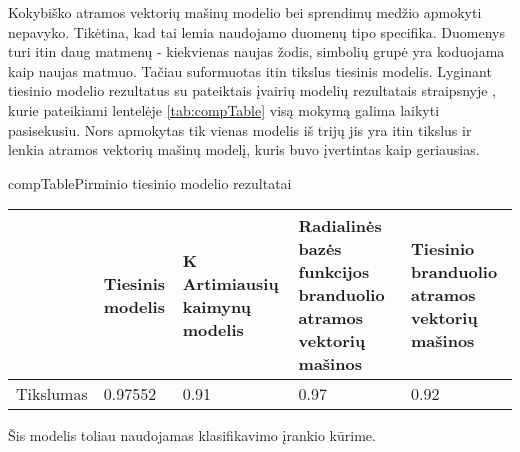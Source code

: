 
Kokybiško atramos vektorių mašinų modelio bei sprendimų medžio apmokyti nepavyko.
Tikėtina, kad tai lemia naudojamo duomenų tipo specifika. Duomenys turi itin daug
matmenų - kiekvienas naujas žodis, simbolių grupė yra koduojama kaip naujas matmuo.
Tačiau suformuotas itin tikslus tiesinis modelis. Lyginant tiesinio modelio rezultatus
su pateiktais įvairių modelių rezultatais straipsnyje \cite{comp}, kurie pateikiami
lentelėje \vref{tab:compTable} visą mokymą galima laikyti pasisekusiu. Nors apmokytas
tik vienas modelis iš trijų jis yra itin tikslus ir lenkia atramos vektorių mašinų
modelį, kuris buvo įvertintas kaip geriausias.

\begin{ktutable}{compTable}{Pirminio tiesinio modelio rezultatai}
    \begin{tabular}{|l|p{3cm}|p{3cm}|p{3cm}|p{3cm}|}
    \hline
                             & Tiesinis modelis  &  K Artimiausių kaimynų modelis  &  Radialinės bazės funkcijos branduolio atramos vektorių mašinos  &  Tiesinio branduolio atramos vektorių mašinos               \\ \hline
               Tikslumas     & 0.97552           & 0.91   & 0.97  &  0.92         \\ \hline
    \end{tabular}
\end{ktutable}

Šis modelis toliau naudojamas klasifikavimo įrankio kūrime.
